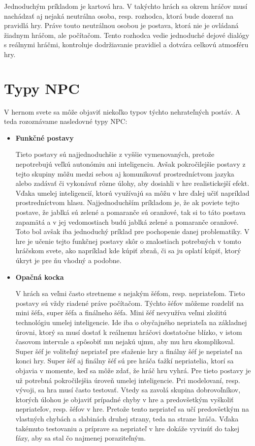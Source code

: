 \documentclass[10pt,twoside,slovak,a4paper]{article}
\begin{document}
\quad Jednoduchým príkladom je kartová hra. V takýchto hrách sa okrem hráčov musí nachádzať aj nejaká neutrálna osoba, resp. rozhodca, ktorá bude dozerať na pravidlá hry. Práve touto neutrálnou osobou je postava, ktorá nie je ovládaná žiadnym hráčom, ale počítačom. Tento rozhodca vedie jednoduché dejové dialógy s reálnymi hráčmi, kontroluje dodržiavanie pravidiel a dotvára celkovú atmosféru hry. ~\cite{NPC, AI} 
\begin{figure}[tbh]
\centering
\end{figure}
\section{Typy NPC} 
\quad V hernom svete sa môže objaviť niekoľko typov týchto nehrateľných postáv. A teda rozoznávame nasledovné typy NPC:\cite{Types}
\begin{itemize}
\item \textbf{Funkčné postavy}

\quad Tieto postavy sú najjednoduchšie z vyššie vymenovaných, pretože nepotrebujú veľkú autonómiu ani inteligenciu. Avšak pokročilejšie postavy z tejto skupiny môžu medzi sebou aj komunikovať prostredníctvom jazyka alebo zadávať či vykonávať rôzne úlohy, aby dosiahli v hre realistickejší efekt. Vďaka umelej inteligencií, ktorú využívajú sa môžu v hre ďalej učiť napríklad prostredníctvom hlasu. Najjednoduchším príkladom je, že ak poviete tejto postave, že jablká sú zelené a pomaranče sú oranžové, tak si to táto postava zapamätá a v jej vedomostiach budú jablká zelené a pomaranče oranžové. Toto bol avšak iba jednoduchý príklad pre pochopenie danej problematiky. V hre je učenie tejto funkčnej postavy skôr o znalostiach potrebných v tomto hráčskom svete, ako napríklad kde kúpiť zbraň, či sa ju oplatí kúpiť, ktorý úkryt je pre ňu vhodný a podobne. 


\item \textbf{Opačná kocka}

\quad V hrách sa veľmi často stretneme s nejakým šéfom, resp. nepriateľom. Tieto postavy sú vždy riadené práve počítačom. Týchto šéfov môžeme rozdeliť na mini šéfa, super šéfa a finálneho šéfa. Mini šéf nevyužíva veľmi zložitú technológiu umelej inteligencie. Ide iba o obyčajného nepriateľa na základnej úrovni, ktorý sa musí dostať k reálnemu hráčovi dostatočne blízko, v istom časovom intervale a spôsobiť mu nejakú ujmu, aby mu hru skomplikoval. Super šéf je voliteľný nepriateľ pre sťaženie hry a finálny šéf je nepriateľ na konci hry. Super šéf aj finálny šéf sú pre hráča ťažkí nepriatelia, ktorí sa objavia v momente, keď sa môže zdať, že hráč hru vyhrá. Pre tieto postavy je už potrebná pokročilejšia úroveň umelej inteligencie. Pri modelovaní, resp. vývoji, sa hra musí často testovať. Vtedy sa zavolá skupina dobrovoľníkov, ktorých úlohou je objaviť prípadné chyby v hre a predovšetkým vyškoliť nepriateľov, resp. šéfov v hre. Pretože tento nepriateľ sa učí predovšetkým na vlastných chybách a slabinách druhej strany, teda na strane hráča. Vďaka takémuto testovaniu a príprave sa nepriateľ v hre dokáže vyvinúť do takej fázy, aby sa stal čo najmenej poraziteľným. 


\end{itemize}
\end{document}
